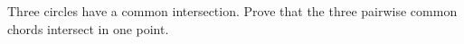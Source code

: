 Three circles have a common intersection. Prove that the three pairwise common chords intersect in one point.
